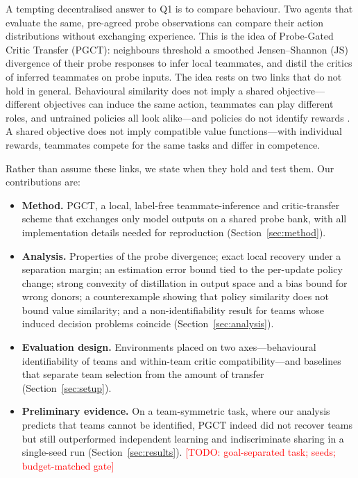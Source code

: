 \documentclass{article}
\theoremstyle{remark}
\newcommand{\todo}[1]{\textcolor{red}{[TODO: #1]}}
\newcommand{\ours}{PGCT}
\begin{document}
A tempting decentralised answer to Q1 is to compare behaviour. Two agents that evaluate the same, pre-agreed probe
observations can compare their action distributions without exchanging experience. This is the idea of Probe-Gated
Critic Transfer (\ours{}): neighbours threshold a smoothed Jensen--Shannon (JS) divergence of their probe responses to
infer local teammates, and distil the critics of inferred teammates on probe inputs. The idea rests on two links that do
not hold in general. Behavioural similarity does not imply a shared objective---different objectives can induce the same
action, teammates can play different roles, and untrained policies all look alike---and policies do not identify rewards
\cite{ng2000irl}. A shared objective does not imply compatible value functions---with individual rewards, teammates
compete for the same tasks and differ in competence.

Rather than assume these links, we state when they hold and test them. Our contributions are:
\begin{itemize}
  \item \textbf{Method.} \ours{}, a local, label-free teammate-inference and critic-transfer scheme that exchanges only model
    outputs on a shared probe bank, with all implementation details needed for reproduction (Section~\ref{sec:method}).
  \item \textbf{Analysis.} Properties of the probe divergence; exact local recovery under a separation margin; an estimation
    error bound tied to the per-update policy change; strong convexity of distillation in output space and a bias bound
    for wrong donors; a counterexample showing that policy similarity does not bound value similarity; and a
    non-identifiability result for teams whose induced decision problems coincide (Section~\ref{sec:analysis}).
  \item \textbf{Evaluation design.} Environments placed on two axes---behavioural identifiability of teams and
    within-team critic compatibility---and baselines that separate team selection from the amount of transfer
    (Section~\ref{sec:setup}).
  \item \textbf{Preliminary evidence.} On a team-symmetric task, where our analysis predicts that teams cannot be
    identified, \ours{} indeed did not recover teams but still outperformed independent learning and indiscriminate
    sharing in a single-seed run (Section~\ref{sec:results}). \todo{goal-separated task; seeds; budget-matched gate}
\end{itemize}
\end{document}
